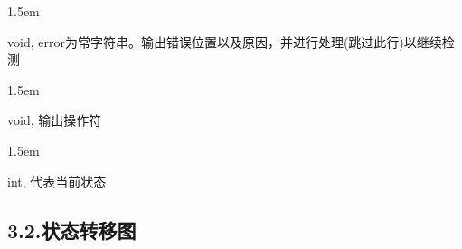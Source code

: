 \documentclass{article}
\begin{document}
\begin{mddefinitions}

\begin{mdbmarginx}{}{}{}{1.5em}%
\begin{mddefdata}%
void, error为常字符串。输出错误位置以及原因，并进行处理(跳过此行)以继续检测
\end{mddefdata}%
\end{mdbmarginx}%


\begin{mdbmarginx}{}{}{}{1.5em}%
\begin{mddefdata}%
void, 输出操作符
\end{mddefdata}%
\end{mdbmarginx}%


\begin{mdbmarginx}{}{}{}{1.5em}%
\begin{mddefdata}%
int, 代表当前状态%
\end{mddefdata}%
\end{mdbmarginx}%
\end{mddefinitions}%

\subsection{3.2.\hspace*{0.5em}状态转移图}\label{section}%
\end{document}
